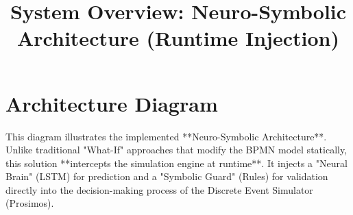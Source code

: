 \documentclass[a4paper]{article}
\begin{document}
\title{System Overview: Neuro-Symbolic Architecture (Runtime Injection)}
\author{}
\date{}
\maketitle

\section{Architecture Diagram}

This diagram illustrates the implemented **Neuro-Symbolic Architecture**. Unlike traditional "What-If" approaches that modify the BPMN model statically, this solution **intercepts the simulation engine at runtime**. It injects a "Neural Brain" (LSTM) for prediction and a "Symbolic Guard" (Rules) for validation directly into the decision-making process of the Discrete Event Simulator (Prosimos).
\end{document}
